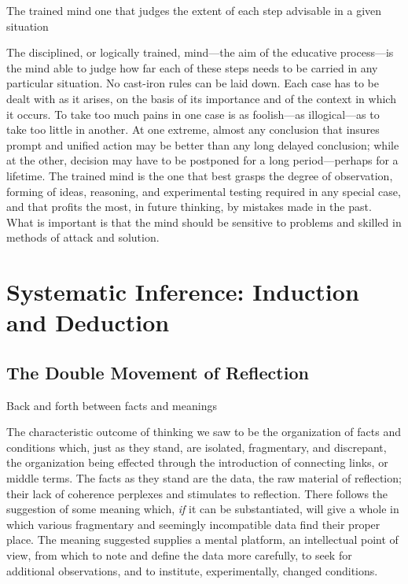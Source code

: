 \documentclass[letterpaper]{book}
\begin{document}
The trained mind one that judges the extent of each step advisable in a
given situation

The disciplined, or logically trained, mind---the aim of the educative
process---is the mind able to judge how far each of these steps needs to
be carried in any particular situation. No cast-iron rules can be laid
down. Each case has to be dealt with as it arises, on the basis of its
importance and of the context in which it occurs. To take too much pains
in one case is as foolish---as illogical---as to take too little in
another. At one extreme, almost any conclusion that insures prompt and
unified action may be better than any long delayed conclusion; while at
the other, decision may have to be postponed for a long period---perhaps
for a lifetime. The trained mind is the one that best grasps the degree
of observation, forming of ideas, reasoning, and experimental testing
required in any special case, and that profits the most, in future
thinking, by mistakes made in the past. What is important is that the
mind should be sensitive to problems and skilled in methods of attack
and
solution.

\chapter{Systematic Inference: Induction and Deduction}

\section{The Double Movement of Reflection}

Back and forth between facts and meanings

The characteristic outcome of thinking we saw to be the organization of
facts and conditions which, just as they stand, are isolated,
fragmentary, and discrepant, the organization being effected through the
introduction of connecting links, or middle terms. The facts as they
stand are the data, the raw material of reflection; their lack of
coherence perplexes and stimulates to reflection. There follows the
suggestion of some meaning which, \emph{if} it can be substantiated,
will give a whole in which various fragmentary and seemingly
incompatible data find their proper place. The meaning suggested
supplies a mental platform, an intellectual point of view, from which to
note and define the data more carefully, to seek for additional
observations, and to institute, experimentally, changed conditions.
\end{document}
